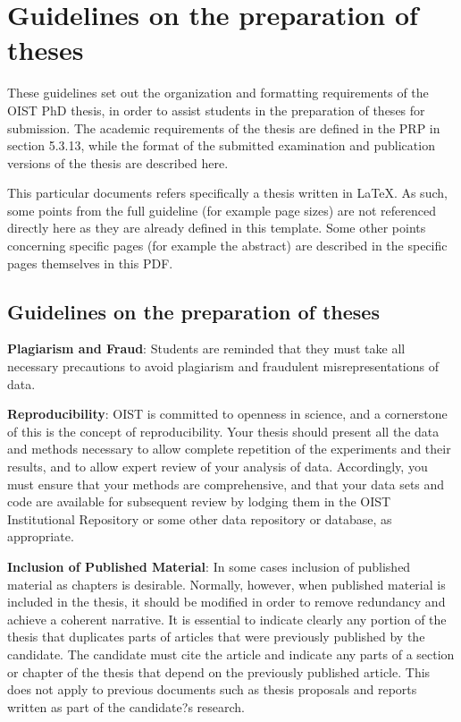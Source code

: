 
\chapter{Guidelines on the preparation of theses} \label{ch-1}

These guidelines set out the organization and formatting requirements of the OIST PhD thesis, in order to assist students in the preparation of theses for submission. The academic requirements of the thesis are defined in the PRP in section 5.3.13, while the format of the submitted examination and publication versions of the thesis are described here.

This particular documents refers specifically a thesis written in \LaTeX. As such, some points from the full guideline (for example page sizes) are not referenced directly here as they are already defined in this template. Some other points concerning specific pages (for example the abstract) are described in the specific pages themselves in this PDF.

\section{Guidelines on the preparation of theses}

\textbf{Plagiarism and Fraud}:  Students are reminded that they must take all necessary precautions to avoid plagiarism and fraudulent misrepresentations of data. 

\textbf{Reproducibility}: OIST is committed to openness in science, and a cornerstone of this is the concept of reproducibility.  Your thesis should present all the data and methods necessary to allow complete repetition of the experiments and their results, and to allow expert review of your analysis of data.  Accordingly, you must ensure that your methods are comprehensive, and that your data sets and code are available for subsequent review by lodging them in the OIST Institutional Repository or some other data repository or database, as appropriate.

\textbf{Inclusion of Published Material}: In some cases inclusion of published material as chapters is desirable. Normally, however, when published material is included in the thesis, it should be modified in order to remove redundancy and achieve a coherent narrative. It is essential to indicate clearly any portion of the thesis that duplicates parts of articles that were previously published by the candidate. The candidate must cite the article and indicate any parts of a section or chapter of the thesis that depend on the previously published article. This does not apply to previous documents such as thesis proposals and reports written as part of the candidate?s research.

